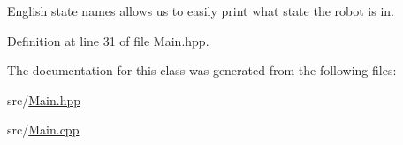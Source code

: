 English state names allows us to easily print what state the robot is in. 



Definition at line 31 of file Main.\-hpp.



The documentation for this class was generated from the following files\-:\begin{DoxyCompactItemize}
\item 
src/\hyperlink{Main_8hpp}{Main.\-hpp}\item 
src/\hyperlink{Main_8cpp}{Main.\-cpp}\end{DoxyCompactItemize}
